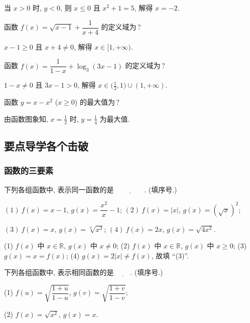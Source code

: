   \beginsolution
    当 $x>0$ 时, $y<0$, 则 $x\leqslant 0$ 且 $x^2+1=5$, 解得 $x=-2$.
  \endsolution
  
  \begin{exercise}
    函数 $f(x)=\sqrt{x-1}+\dfrac1{x+4}$ 的定义域为\,?
  \end{exercise}

  \beginsolution
    $x-1\geqslant 0$ 且 $x+4\neq 0$, 解得 $x\in[1,+\infty)$.
  \endsolution
  
  \begin{exercise}
    函数 $f(x)=\dfrac1{1-x}+ \log_3(3x-1)$ 的定义域为\,?
  \end{exercise}

  \beginsolution
    $1-x\neq 0$ 且 $3x-1>0$, 解得 $x\in\Big(\frac13,1\Big)\cup(1,+\infty)$.
  \endsolution
  
  \begin{exercise}
    函数 $y=x-x^2$ ($x\geqslant 0$) 的最大值为\,?
  \end{exercise}

  \beginsolution
    由函数图象知, $x=\frac12$ 时, $y=\frac14$ 为最大值.
  \endsolution
  
  \subsection{要点导学\quad 各个击破}
  \subsubsection{函数的三要素}
  \begin{example}
    下列各组函数中, 表示同一函数的是 $\underline{\qquad\qquad}$. (填序号.)

    $(1)\ f(x)=x-1$, $g(x)=\dfrac{x^2}{x}-1$;\qquad
    $(2)\ f(x)=|x|$, $g(x)=(\sqrt{x})^2$;

    $(3)\ f(x)=x$, $g(x)=\sqrt[3]{x^3}$;\qquad
    $(4)\ f(x)=2x$, $g(x)=\sqrt{4x^2}$.
  \end{example}

  \beginsolution
    (1) $f(x)$ 中 $x\in\mathbb{R}$, $g(x)$ 中 $x\neq 0$;
    (2) $f(x)$ 中 $x\in\mathbb{R}$, $g(x)$ 中 $x\geqslant 0$;
    (3) $g(x)=x=f(x)$; (4) $g(x)=2|x|\neq f(x)$, 故填 ``(3)''.
  \endsolution
  
  \lianxi
  \begin{exercise}[s]
    下列各组函数中, 表示相同函数的是 $\underline{\qquad}$. (填序号.)

    (1) $f(u)=\sqrt{\dfrac{1+u}{1-u}}$, $g(v)=\sqrt{\dfrac{1+v}{1-v}}$;

    (2) $f(x)=\sqrt{x^2}$, $g(x)=x$.
  \end{exercise}

